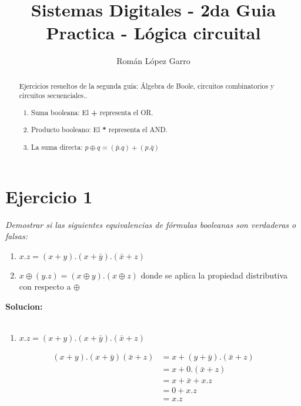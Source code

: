 \documentclass[12pt]{article}
\title{Sistemas Digitales - 2da Guia Practica - Lógica circuital}
\author{Román López Garro}
\begin{document}
\maketitle

\begin{abstract}
    Ejercicios resueltos de la segunda guía: Álgebra de Boole, circuitos combinatorios y circuitos secuenciales..

\begin{enumerate}[left=0pt, label=\alph*), leftmargin=*]
	\item Suma booleana: El \textbf{+} representa el OR.
	\item Producto booleano: El \textbf{*} representa el AND.
	\item La suma directa: $ p \oplus q = ( \bar p.q) + (p.\bar q) $
\end{enumerate}


\end{abstract}

\tableofcontents

\newpage

\section*{Ejercicio 1}

\textit{Demostrar si las siguientes equivalencias de fórmulas booleanas son verdaderas o falsas: }

\begin{enumerate}[left=0pt, label=\alph*), leftmargin=*]
	\item $x.z = (x + y).(x + \bar y).(\bar x + z)$
	\item $x \oplus (y.z) = (x \oplus y).(x \oplus z)$ donde se aplica la propiedad distributiva con respecto a $\oplus$

\end{enumerate}

\textbf{Solucion: } \\
                    \\

\begin{enumerate}[left=0pt, label=\alph*), leftmargin=*]
	\item $x.z = (x + y).(x + \bar y).(\bar x + z)$
\end{enumerate}

\begin{align*}
	(x+y).(x+\bar y)(\bar x + z) &= x + (y + \bar y).(\bar x + z) \\
	&= x + 0.(\bar x + z) \\
	&= x + \bar x + x.z \\
	&= 0 + x . z \\ &= x.z
\end{align*}
\end{document}
